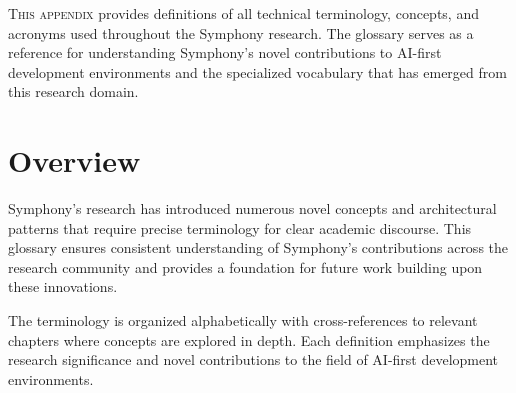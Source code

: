 \appendix
\label{app:glossary}

\vspace{0.3cm}


\lettrine{T}{his appendix} provides definitions of all technical terminology, concepts, and acronyms used throughout the Symphony research. The glossary serves as a reference for understanding Symphony's novel contributions to AI-first development environments and the specialized vocabulary that has emerged from this research domain.

\vspace{0.2cm}
\section*{Overview}

Symphony's research has introduced numerous novel concepts and architectural patterns that require precise terminology for clear academic discourse. This glossary ensures consistent understanding of Symphony's contributions across the research community and provides a foundation for future work building upon these innovations.

The terminology is organized alphabetically with cross-references to relevant chapters where concepts are explored in depth. Each definition emphasizes the research significance and novel contributions to the field of AI-first development environments.


